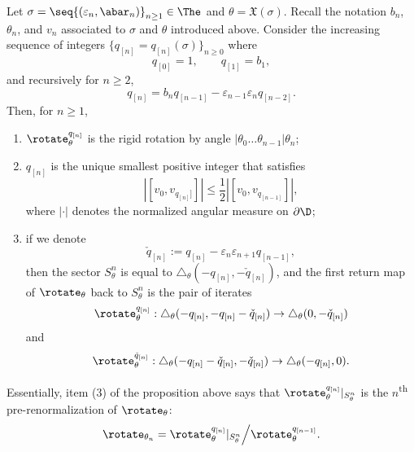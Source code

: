 \documentclass{amsart}
\begin{document}
\begin{proposition}
\label{prop:q[n]}
    Let $\sigma = \seq{ (\varepsilon_n, \abar_n)}_{n\geq 1} \in \The$ and $\theta = \mathfrak{X}(\sigma)$.
    Recall the notation $b_n$, $\theta_n$, and $v_n$ associated to $\sigma$ and $\theta$ introduced above.
    Consider the increasing sequence of integers $\{q_{[n]}=q_{[n]}(\sigma)\}_{n\geq 0}$ where
\[
    q_{[0]} = 1, \qquad q_{[1]} = b_1, 
\]
and recursively for $n\geq 2$,
\[
    q_{[n]} = b_n q_{[n-1]} - \varepsilon_{n-1} \varepsilon_n  q_{[n-2]}.
\]
    Then, for $n \geq 1$,
\begin{enumerate}
    \item $\rotate_{\theta}^{q_{[n]}}$ is the rigid rotation by angle $|\theta_0\ldots\theta_{n-1}|\theta_n$;
    \item $q_{[n]}$ is the unique smallest positive integer that satisfies 
    \[
    \left| [v_0, v_{q_{[n]}]}] \right| \leq \frac{1}{2} \left| [v_0, v_{q_{[n-1]}}] \right|,
    \]
    where $|\cdot|$ denotes the normalized angular measure on $\partial \D$;
    \item if we denote 
    \[
        \check{q}_{[n]} := q_{[n]} - \varepsilon_n \varepsilon_{n+1} q_{[n-1]},
    \]
    then the sector $S_{\theta}^n$ is equal to 
    $ \triangle_{\theta} (-q_{[n]}, -\check{q}_{[n]})$, and the first return map of $\rotate_\theta$ back to $S_{\theta}^n$ is the pair of iterates
    \[
        \rotate_\theta^{q_{[n]}}: 
        \triangle_{\theta} (-q_{[n]}, -q_{[n]} - \check{q}_{[n]})
        \to  
        \triangle_{\theta}(0,-\check{q}_{[n]})
    \]
    and
    \[ 
        \rotate_\theta^{\check{q}_{[n]}}: \triangle_{\theta}(-q_{[n]} - \check{q}_{[n]}, -\check{q}_{[n]}) 
        \to 
        \triangle_{\theta}(-q_{[n]}, 0). 
    \]
\end{enumerate}
\end{proposition}

Essentially, item (3) of the proposition above says that $\rotate_\theta^{q_{[n]}}|_{S_{\theta}^n}$ is the $n$\textsuperscript{th} pre-renormalization of $\rotate_\theta$:
\[
    \rotate_{\theta_n} = \rotate_\theta^{q_{[n]}}|_{S_{\theta}^n} \Big/ \rotate_\theta^{q_{[n-1]}}.
\]
\end{document}

